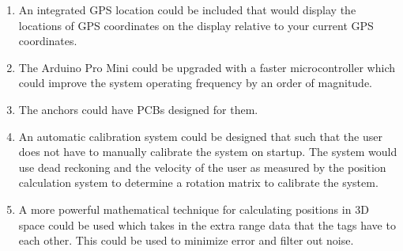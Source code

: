 \begin{enumerate}
	\item An integrated GPS location could be included that would display the locations of GPS coordinates on the display relative to your current GPS coordinates.
	\item The Arduino Pro Mini could be upgraded with a faster microcontroller which could improve the system operating frequency by an order of magnitude.
	\item The anchors could have PCBs designed for them.
	\item An automatic calibration system could be designed that such that the user does not have to manually calibrate the system on startup. The system would use dead reckoning and the velocity of the user as measured by the position calculation system to determine a rotation matrix to calibrate the system.
	\item A more powerful mathematical technique for calculating positions in 3D space could be used which takes in the extra range data that the tags have to each other. This could be used to minimize error and filter out noise.
\end{enumerate}